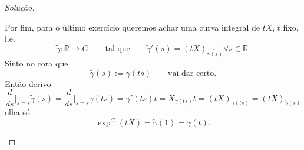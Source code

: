\begin{proof}[Solução]
\begin{enumerate}
Por fim, para o último exercício queremos achar uma curva integral de \(tX\), \(t\) fixo, i.e.
\[\tilde{\gamma}:\mathbb{R}\to G\qquad \text{tal que} \qquad \tilde{\gamma}'(s)=(tX)_{\tilde{\gamma(s)}}\forall s \in \mathbb{R}.\]
Sinto no cora que 
\[\tilde{\gamma}(s):=\gamma(ts)\qquad \text{vai dar certo.} \]
Então derivo
\[\frac{d}{ds}\Big|_{s=s}\tilde{\gamma}(s)=\frac{d}{ds}\Big|_{s=s}\gamma(ts)=\gamma'(ts)t=X_{\gamma(t s)}t=(tX)_{\gamma( ts)}=(tX)_{\tilde{\gamma}(s)}\]
olha só
\[\operatorname{exp}^G(tX)=\tilde{\gamma}(1)=\gamma(t).\]

\end{enumerate}
\end{proof}


